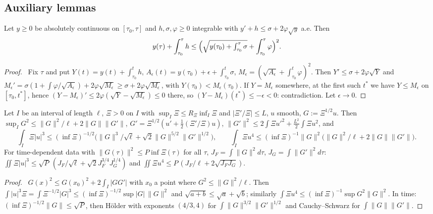 \documentclass[11pt]{article}
\theoremstyle{definition}\newtheorem{definition}[theorem]{Definition}
\theoremstyle{remark}\newtheorem{remark}[theorem]{Remark}
\begin{document}
\subsection{Auxiliary lemmas}
\begin{lemma}[comparison]\label{lem:cmp}
Let $y\ge0$ be absolutely continuous on $[\tau_0,\tau]$ and $h,\sigma,\varphi\ge0$ integrable with $y'+h\le\sigma+2\varphi\sqrt y$ a.e. Then
\[
y(\tau)+\int_{\tau_0}^\tau h\le\Bigl(\sqrt{y(\tau_0)+\textstyle\int_{\tau_0}^\tau\sigma}+\int_{\tau_0}^\tau\varphi\Bigr)^2 .
\]
\end{lemma}
\begin{proof}\tP\ Fix $\tau$ and put $Y(t)=y(t)+\int_{\tau_0}^th$, $A_\epsilon(t)=y(\tau_0)+\epsilon+\int_{\tau_0}^t\sigma$, $M_\epsilon=(\sqrt{A_\epsilon}+\int_{\tau_0}^t\varphi)^2$. Then $Y'\le\sigma+2\varphi\sqrt Y$ and $M_\epsilon'=\sigma(1+\int\varphi/\sqrt{A_\epsilon})+2\varphi\sqrt{M_\epsilon}\ge\sigma+2\varphi\sqrt{M_\epsilon}$, with $Y(\tau_0)<M_\epsilon(\tau_0)$. If $Y=M_\epsilon$ somewhere, at the first such $t^*$ we have $Y\le M_\epsilon$ on $[\tau_0,t^*]$, hence $(Y-M_\epsilon)'\le2\varphi(\sqrt Y-\sqrt{M_\epsilon})\le0$ there, so $(Y-M_\epsilon)(t^*)\le-\epsilon<0$: contradiction. Let $\epsilon\to0$.
\end{proof}
\begin{lemma}\label{lem:S}
Let $I$ be an interval of length $\ell$, $\Xi>0$ on $I$ with $\sup_I\Xi\le R_\Xi\inf_I\Xi$ and $|\Xi'/\Xi|\le L$, $u$ smooth, $G:=\Xi^{1/2}u$. Then $\sup_IG^2\le\|G\|^2/\ell+2\|G\|\|G'\|$, $G'=\Xi^{1/2}(u'+\frac12(\Xi'/\Xi)u)$, $\|G'\|^2\le2\int\Xi u'^2+\frac{L^2}2\int\Xi u^2$, and
\[
\int_I\Xi|u|^3\le(\inf\Xi)^{-1/2}\bigl(\|G\|^3/\sqrt\ell+\sqrt2\|G\|^{5/2}\|G'\|^{1/2}\bigr),\qquad
\int_I\Xi u^4\le(\inf\Xi)^{-1}\|G\|^2\bigl(\|G\|^2/\ell+2\|G\|\|G'\|\bigr).
\]
For time-dependent data with $\|G(\tau)\|^2\le P\inf\Xi(\tau)$ for all $\tau$, $J_F=\int\|G\|^2d\tau$, $J_G=\int\|G'\|^2d\tau$: $\iint\Xi|u|^3\le\sqrt P\,(J_F/\sqrt\ell+\sqrt2J_F^{3/4}J_G^{1/4})$ and $\iint\Xi u^4\le P\,(J_F/\ell+2\sqrt{J_FJ_G})$.
\end{lemma}
\begin{proof}\tP\ $G(x)^2\le G(x_0)^2+2\int_I|GG'|$ with $x_0$ a point where $G^2\le\|G\|^2/\ell$. Then $\int|u|^3\Xi=\int\Xi^{-1/2}|G|^3\le(\inf\Xi)^{-1/2}\sup|G|\,\|G\|^2$ and $\sqrt{a+b}\le\sqrt a+\sqrt b$; similarly $\int\Xi u^4\le(\inf\Xi)^{-1}\sup G^2\|G\|^2$. In time: $(\inf\Xi)^{-1/2}\|G\|\le\sqrt P$, then H\"older with exponents $(4/3,4)$ for $\int\|G\|^{3/2}\|G'\|^{1/2}$ and Cauchy--Schwarz for $\int\|G\|\|G'\|$.
\end{proof}
\end{document}
